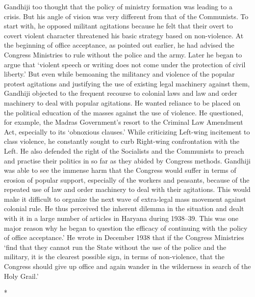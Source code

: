 \begin{multicols}{2}
Gandhiji too thought that the policy of ministry formation was leading to a crisis. But his angle of vision was very different from that of the Communists. To start with, he opposed militant agitations because he felt that their overt to covert violent character threatened his basic strategy based on non-violence. At the beginning of office acceptance, as pointed out earlier, he had advised the Congress Ministries to rule without the police and the army. Later he began to argue that `violent speech or writing does not come under the protection of civil liberty.' But even while bemoaning the militancy and violence of the popular protest agitations and justifying the use of existing legal machinery against them, Gandhiji objected to the frequent recourse to colonial laws and law and order machinery to deal with popular agitations. He wanted reliance to be placed on the political education of the masses against the use of violence. He questioned, for example, the Madras Government's resort to the Criminal Law Amendment Act, especially to its `obnoxious clauses.' While criticizing Left-wing incitement to class violence, he constantly sought to curb Right-wing confrontation with the Left. He also defended the right of the Socialists and the Communists to preach and practise their politics in so far as they abided by Congress methods. Gandhiji was able to see the immense harm that the Congress would suffer in terms of erosion of popular support, especially of the workers and peasants, because of the repeated use of law and order machinery to deal with their agitations. This would make it difficult to organize the next wave of extra-legal mass movement against colonial rule. He thus perceived the inherent dilemma in the situation and dealt with it in a large number of articles in Haryana during 1938--39. This was one major reason why he began to question the efficacy of continuing with the policy of office acceptance.' He wrote in December 1938 that if the Congress Ministries `find that they cannot run the State without the use of the police and the military, it is the clearest possible sign, in terms of non-violence, that the Congress should give up office and again wander in the wilderness in search of the Holy Grail.'

\begin{center}*\end{center}


\end{multicols}
